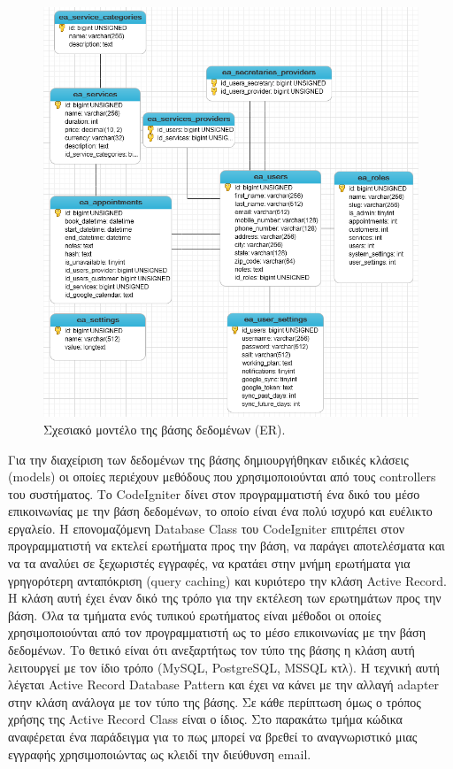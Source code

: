 \begin{figure}[ht!]
\centering
\includegraphics[width=160mm]{images/er.png}
\caption{Σχεσιακό μοντέλο της βάσης δεδομένων (ER).}
\label{er}
\end{figure}

Για την διαχείριση των δεδομένων της βάσης δημιουργήθηκαν ειδικές κλάσεις (models) οι οποίες περιέχουν μεθόδους που χρησιμοποιούνται από τους controllers του συστήματος. Το CodeIgniter δίνει στον προγραμματιστή ένα δικό του μέσο επικοινωνίας με την βάση δεδομένων, το οποίο είναι ένα πολύ ισχυρό και ευέλικτο εργαλείο. Η επονομαζόμενη Database Class του CodeIgniter επιτρέπει στον προγραμματιστή να εκτελεί ερωτήματα προς την βάση, να παράγει αποτελέσματα και να τα αναλύει σε ξεχωριστές εγγραφές, να κρατάει στην μνήμη ερωτήματα για γρηγορότερη ανταπόκριση (query caching) και κυριότερο την κλάση Active Record. Η κλάση αυτή έχει έναν δικό της τρόπο για την εκτέλεση των ερωτημάτων προς την βάση. Όλα τα τμήματα ενός τυπικού ερωτήματος είναι μέθοδοι οι οποίες χρησιμοποιούνται από τον προγραμματιστή ως το μέσο επικοινωνίας με την βάση δεδομένων. Το θετικό είναι ότι ανεξαρτήτως τον τύπο της βάσης η κλάση αυτή λειτουργεί με τον ίδιο τρόπο (MySQL, PostgreSQL, MSSQL κτλ). Η τεχνική αυτή λέγεται Active Record Database Pattern και έχει να κάνει με την αλλαγή adapter στην κλάση ανάλογα με τον τύπο της βάσης. Σε κάθε περίπτωση όμως ο τρόπος χρήσης της Active Record Class είναι ο ίδιος. Στο παρακάτω τμήμα κώδικα αναφέρεται ένα παράδειγμα για το πως μπορεί να βρεθεί το αναγνωριστικό μιας εγγραφής χρησιμοποιώντας ως κλειδί την διεύθυνση email.

